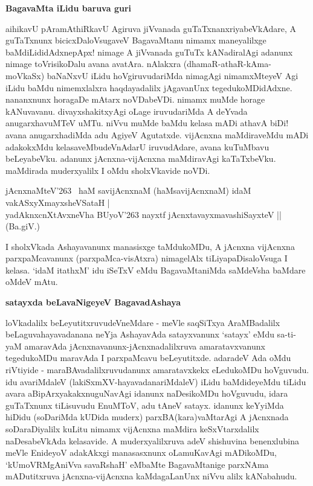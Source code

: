 {\bigskip
\noindent
{\large\bf BagavaMta iLidu baruva guri}}\label{page72}
\medskip

\noindent
aihikavU pAramAthiRkavU Agiruva jiVvanada guTaTxnanxriyabeVkAdare, A guTaTxnunx bicicxDaloVsu\-gaveV BagavaMtanu nimamx maneyalilxge baMdiLididAdxnepApx! nimage A jiVvanada guTuTx kANadiralAgi adanunx\- ni\-mage toVrisikoDalu avana avatAra. nAlakxra (dhamaR-athaR-kAma-moVkaSx) baNaNxvU iLidu hoVgi\-ruvudariMda nimagAgi nimamxMteyeV Agi iLidu baMdu nimemxlalxra haqdayadalilx jAgavanUnx tegedu\-koMDi\-dAdxne. nananxnunx horagaDe mAtarx noVDabeVDi. nimamx muMde horage kANuvavanu. divayxshakitx\-yAgi oLage iruvudariMda A deYvada anugarxhavuMTeV uMTu. niVvu muMde baMdu kelasa mADi athavA biDi! avana anugarxhadiMda adu AgiyeV Agutatxde. vijAcnxna maMdiraveMdu mADi adakokxMdu kelasa\-veMbudeVnAdarU iruvudAdare, avana kuTuMbavu beLeyabeVku. adanunx jAcnxna-vijAcnxna maMdira\-vAgi kaTaTxbeVku. maMdirada muderxyalilx I oMdu sholxVkavide noVDi.

\begin{shloka}
jAcnxnaMteV\char'263 \, haM savijAcnxnaM (haMsavijAcnxnaM) idaM vakASxyXmayxsheVSataH |\\\label{102}
yadAknxcnXtAvxneVha BUyoV\char'263 nayxtf jAcnxtavayxmavashiSayxteV || \hfill{(Ba.giV.)}
\end{shloka}

\noindent
I sholxVkada Ashayavanunx manasisxge taMdukoMDu, A jAcnxna vijAcnxna parxpaMcavanunx (parxpaMca-visAtxra) nimagelAlx tiLiyapaDisaloVsuga I kelasa. `idaM itathxM' idu iSeTxV eMdu BagavaMtaniMda saMdeVsha baMdare oMdeV mAtu.

{\bigskip
\noindent
{\large\bf satayxda beLavaNigeyeV BagavadAshaya}}\label{page72}
\medskip

\noindent
loVkadalilx beLeyutitxruvudeVneMdare - meVle saqSiTxya AraMBadalilx beLaguva\break hayavadanana neYja Ashaya\-vAda satayxvanunx `satayx' eMdu sa-ti-yaM amaravAda jAcnxnavanunx-jAcnxnadalilxruva amaratavxvanunx tegedu\-koMDu maravAda I parxpaMcavu beLeyutitxde. adaradeV Ada oMdu riVtiyide - maraBAvadalilxru\-vudanunx ama\-ratavxkekx eLedukoMDu hoVguvudu. idu avariMdaleV (lakiSxmXV-hayavadana\-riMdaleV) iLidu baMdideyeMdu tiLidu avara aBipArxyakakxnuguNavAgi idanunx naDesikoMDu hoVguvudu, idara guTaTxnunx tiLisuvudu EnuMToV, adu tAneV satayx. idanunx keYyiMda hiDidu (soDariMda kU\-Dida muderx) parxBA(kara)vaMtarAgi A jAcnxnada soDaraDiyalilx kuLitu nimamx vijAcnxna maMdira keSxVtarx\-dalilx naDesabeVkAda kelasavide. A muderxyalilxruva adeV shishuvina benenxlubina meVle EnideyoV adakAkxgi manasasxnunx oLamuKavAgi mADikoMDu, `kUmoVRMgAniVva savaRshaH'\label{73} eMbaMte BagavaMtanige \-parxNAma mADutitxruva jAcnxna-vijAcnxna kaMdagaLanUnx niVvu alilx kANabahudu.

